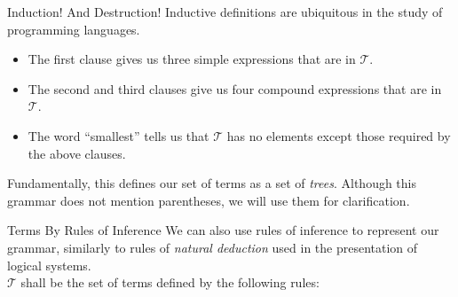 \documentclass[11pt]{beamer}
\begin{document}
\begin{frame}[fragile=singleslide]{Induction! And Destruction!}
Inductive definitions are ubiquitous in the study of programming languages.  
\begin{itemize}
\item The first clause gives us three simple expressions that are in $\mathcal{T}$. 
\item The second and third clauses give us four compound expressions that are in $\mathcal{T}$.
\item The word ``smallest'' tells us that $\mathcal{T}$ has no elements except those required by the above clauses.  
\end{itemize}
Fundamentally, this defines our set of terms as a set of \emph{trees}.  Although this grammar does not mention parentheses, we will use them for clarification.  
\end{frame}

\begin{frame}[fragile=singleslide]{Terms By Rules of Inference}
We can also use rules of inference to represent our grammar, similarly to rules of \emph{natural deduction} used in the presentation of logical systems.  \\

$\mathcal{T}$ shall be the set of terms defined by the following rules: 
\begin{center}
\end{center}
\end{frame}
\end{document}
